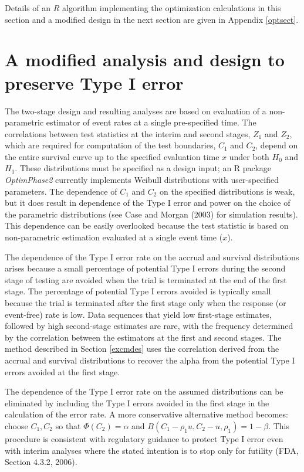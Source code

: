 \documentclass[12pt]{article}
\begin{document}
Details of an $R$ algorithm implementing the optimization calculations in this section and a
modified design in the next section are given in Appendix  \ref{optsect}.


\section{A modified analysis and design to preserve Type I error}
\label{consdes}

The two-stage design and resulting analyses are based on evaluation of a non-parametric estimator
of event rates at a single pre-specified time. The correlations between test statistics at the
interim and second stages, $Z_1$ and $Z_2$, which are required for computation of the test
boundaries, $C_1$ and $C_2$, depend on the entire survival curve up to the specified evaluation
time $x$ under both $H_0$ and $H_1$.  These distributions must be specified as a design input;  an
R package {\it OptimPhase2} currently implements Weibull distributions with user-specified
parameters. The dependence of $C_1$ and $C_2$ on the specified distributions is weak, but it does
result in
 dependence of the Type I error and power on the choice of the parametric distributions (see
Case and Morgan (2003) for simulation results).  This dependence can be easily overlooked because
the test statistic is based on non-parametric estimation evaluated at a single event time ($x$).

The dependence of the Type I error rate on the accrual and survival distributions arises because a
small percentage of potential Type I errors during the second stage of testing are avoided when the
trial is terminated at the end of the first stage.  The percentage of potential Type I errors
avoided is typically small because the trial is terminated after the first stage only when the
response (or event-free) rate is low.  Data sequences that yield low first-stage estimates,
followed by high second-stage estimates are rare, with the frequency determined by the correlation
between the estimators at the first and second stages.  The  method described in Section
\ref{excmdes} uses the correlation derived from the accrual and survival distributions to recover
the alpha from the potential Type I errors avoided at the first stage.

The dependence of the Type I error rate on the assumed distributions can be eliminated by including
the Type I errors avoided in the first stage in the calculation of the error rate.  A more
conservative alternative method becomes: choose $C_1, C_2$ so that $\Phi(C_2)=\alpha$ and
$B(C_1-\rho_1 u,C_2-u,\rho_1)=1-\beta$.  This procedure is consistent with regulatory guidance to protect Type I error even with interim analyses where the stated intention is to stop only for futility (FDA, Section 4.3.2, 2006).
\end{document}
